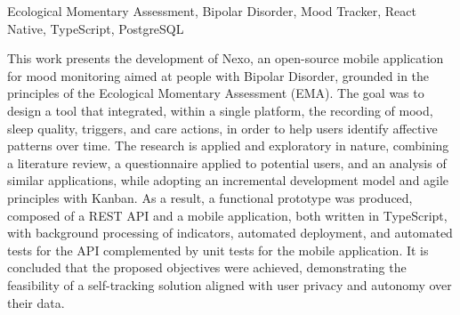 \documentclass[tcc,capa,table]{textsi}
\begin{document}
\begin{abstract}
\noindent
Este trabalho apresenta o desenvolvimento do Nexo, uma aplicação móvel de
código aberto voltada ao monitoramento do humor de pessoas com Transtorno
Bipolar, fundamentada nos princípios da \textit{Ecological Momentary
Assessment} (EMA). O objetivo foi conceber uma ferramenta que integrasse, em
uma única plataforma, o registro de humor, a qualidade do sono, gatilhos e
ações de cuidado, de modo a auxiliar o usuário na identificação de padrões
afetivos ao longo do tempo. A pesquisa caracteriza-se como aplicada, de
natureza exploratória, e combinou levantamento bibliográfico, aplicação de
questionário com potenciais usuários e análise de aplicativos similares,
empregando o modelo incremental e princípios ágeis com \textit{Kanban} no
desenvolvimento. Como resultado, obteve-se um protótipo funcional composto por
uma API REST e um aplicativo móvel, ambos em TypeScript, com processamento de
indicadores em segundo plano, implantação automatizada e testes automatizados
da API, complementados por testes unitários do aplicativo móvel.
Conclui-se que os objetivos propostos foram alcançados, evidenciando a
viabilidade de uma solução de autorregistro alinhada à privacidade e à
autonomia do usuário sobre seus dados.
\end{abstract}

\begin{englishabstract}%
  {Ecological Momentary Assessment, Bipolar Disorder, Mood Tracker, React
  Native, TypeScript, PostgreSQL}

  \noindent
  This work presents the development of Nexo, an open-source mobile application
  for mood monitoring aimed at people with Bipolar Disorder, grounded in the
  principles of the Ecological Momentary Assessment (EMA). The goal was to
  design a tool that integrated, within a single platform, the recording of
  mood, sleep quality, triggers, and care actions, in order to help users
  identify affective patterns over time. The research is applied and
  exploratory in nature, combining a literature review, a questionnaire applied
  to potential users, and an analysis of similar applications, while adopting
  an incremental development model and agile principles with Kanban. As a
  result, a functional prototype was produced, composed of a REST API and a
  mobile application, both written in TypeScript, with background processing of
  indicators, automated deployment, and automated tests for the API complemented
  by unit tests for the mobile application. It is concluded that the proposed
  objectives were achieved, demonstrating the feasibility of a self-tracking
  solution aligned with user privacy and autonomy over their data.
\end{englishabstract}
\end{document}
